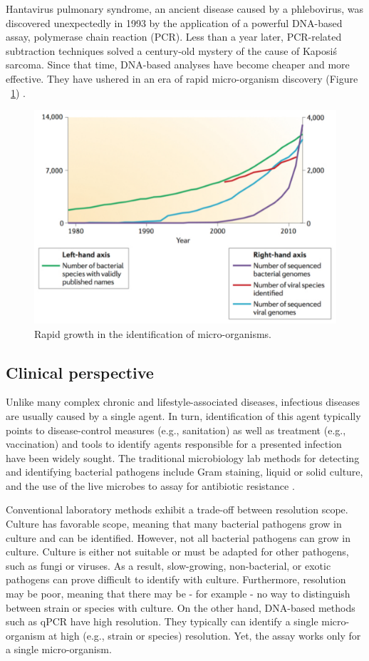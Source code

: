 Hantavirus pulmonary syndrome, an ancient disease caused by a phlebovirus, was discovered unexpectedly in 1993 by the application of a powerful DNA-based assay, polymerase chain reaction (PCR). Less than a year later, PCR-related subtraction techniques solved a century-old mystery of the cause of Kaposi\'s sarcoma. Since that time, DNA-based analyses have become cheaper and more effective. They have ushered in an era of rapid micro-organism discovery (Figure ~\ref{fig:Fig1}) \cite{Fournier:2013ew}.

\begin{figure}
\center\includegraphics[width=120mm,scale=0.5]{Figures/Fig1}
\caption{Rapid growth in the identification of micro-organisms.}
\label{fig:Fig1}
\end{figure}

\subsection{Clinical perspective}

Unlike many complex chronic and lifestyle-associated diseases, infectious diseases are usually caused by a single agent. In turn, identification of this agent typically points to disease-control measures (e.g., sanitation) as well as treatment (e.g., vaccination) \cite{Fauci:2012us} and tools to identify agents responsible for a presented infection have been widely sought. The traditional microbiology lab methods for detecting and identifying bacterial pathogens include Gram staining, liquid or solid culture, and the use of the live microbes to assay for antibiotic resistance \cite{Boyd:2013cc}.

Conventional laboratory methods exhibit a trade-off between resolution scope. Culture has favorable scope, meaning that many bacterial pathogens grow in culture and can be identified. However, not all bacterial pathogens can grow in culture. Culture is either not suitable or must be adapted for other pathogens, such as fungi or viruses. As a result, slow-growing, non-bacterial, or exotic pathogens can prove difficult to identify with culture. Furthermore, resolution may be poor, meaning that there may be - for example - no way to distinguish between strain or species with culture. On the other hand, DNA-based methods such as qPCR have high resolution. They typically can identify a single micro-organism at high (e.g., strain or species) resolution. Yet, the assay works only for a single micro-organism.

